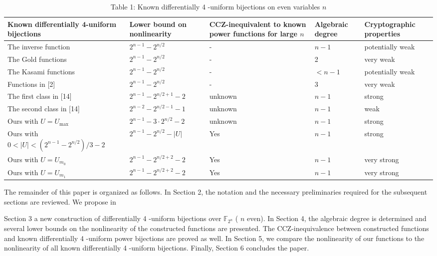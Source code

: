 \documentclass[10pt]{article}
\begin{document}
\begin{table}[h]
\begin{center}
\captionsetup{labelformat=empty}
\caption{Table 1: Known differentially 4 -uniform bijections on even variables $n$}
\begin{tabular}{|l|l|l|l|l|}
\hline
Known differentially 4-uniform bijections & Lower bound on nonlinearity & CCZ-inequivalent to known power functions for large $n$ & Algebraic degree & Cryptographic properties \\
\hline
The inverse function & $2^{n-1}-2^{n / 2}$ & - & $n-1$ & potentially weak \\
\hline
The Gold functions & $2^{n-1}-2^{n / 2}$ & - & 2 & very weak \\
\hline
The Kasami functions & $2^{n-1}-2^{n / 2}$ & - & $<n-1$ & potentially weak \\
\hline
Functions in [2] & $2^{n-1}-2^{n / 2}$ & - & 3 & very weak \\
\hline
The first class in [14] & $2^{n-1}-2^{n / 2+1}-2$ & unknown & $n-1$ & strong \\
\hline
The second class in [14] & $2^{n-2}-2^{n / 2-1}-1$ & unknown & $n-1$ & weak \\
\hline
Ours with $U=U_{\text {max }}$ & $2^{n-1}-3 \cdot 2^{n / 2}-2$ & unknown & $n-1$ & strong \\
\hline
Ours with $0<|U|<\left(2^{n-1}-2^{n / 2}\right) / 3-2$ & $2^{n-1}-2^{n / 2}-|U|$ & Yes & $n-1$ & strong \\
\hline
Ours with $U=U_{m_{0}}$ & $2^{n-1}-2^{n / 2+2}-2$ & Yes & $n-1$ & very strong \\
\hline
Ours with $U=U_{m_{1}}$ & $2^{n-1}-2^{n / 2+2}-2$ & Yes & $n-1$ & very strong \\
\hline
\end{tabular}
\end{center}
\end{table}

The remainder of this paper is organized as follows. In Section 2, the notation and the necessary preliminaries required for the subsequent sections are reviewed. We propose in

Section 3 a new construction of differentially 4 -uniform bijections over $\mathbb{F}_{2^{n}}$ ( $n$ even). In Section 4, the algebraic degree is determined and several lower bounds on the nonlinearity of the constructed functions are presented. The CCZ-inequivalence between constructed functions and known differentially 4 -uniform power bijections are proved as well. In Section 5, we compare the nonlinearity of our functions to the nonlinearity of all known differentially 4 -uniform bijections. Finally, Section 6 concludes the paper.
\end{document}
